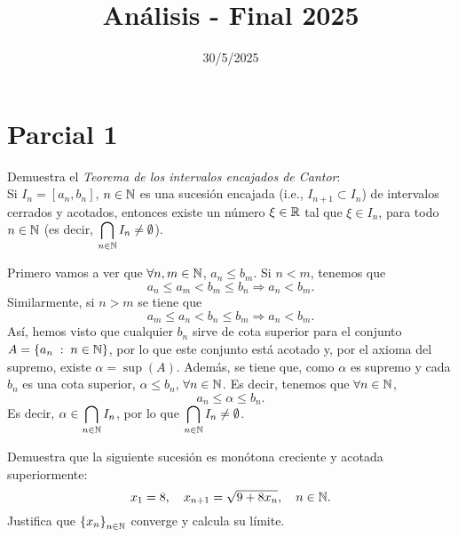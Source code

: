 \documentclass{article}
\begin{document}
\title{Análisis - Final 2025}
\date{30/5/2025}

\maketitle
\section{Parcial 1}
\begin{ej}
	Demuestra el \textit{Teorema de los intervalos encajados de Cantor}: \\
	Si $\displaystyle I_{n} = \left[a_{n}, b_{n}\right]  $, $\displaystyle n \in \mathbb{N} $ es una sucesión encajada (i.e., $\displaystyle I_{n+1} \subset I_{n} $) de intervalos cerrados y acotados, entonces existe un número $\displaystyle \xi \in \mathbb{R} $ tal que $\displaystyle \xi \in I_{n} $, para todo $\displaystyle n \in \mathbb{N} $ (es decir, $\displaystyle \bigcap_{n \in \mathbb{N}}I_{n} \neq \emptyset $).
\end{ej}
\begin{sol}
Primero vamos a ver que $\displaystyle \forall n,m \in \mathbb{N} $, $\displaystyle a_{n} \leq b_{m} $. Si $\displaystyle n < m $, tenemos que 
\[a_{n} \leq a_{m} < b_{m} \leq b_{n} \Rightarrow a_{n} < b_{m} .\]
Similarmente, si $\displaystyle n > m $ se tiene que 
\[a_{m} \leq a_{n} < b_{n} \leq b_{m} \Rightarrow a_{n} < b_{m} .\]
Así, hemos visto que cualquier $\displaystyle b_{n} $ sirve de cota superior para el conjunto $\displaystyle A = \left\{ a_{n} \; : \; n \in \mathbb{N}\right\}  $, por lo que este conjunto está acotado y, por el axioma del supremo, existe $\displaystyle \alpha = \sup\left(A\right) $. Además, se tiene que, como $\displaystyle \alpha  $ es supremo y cada $\displaystyle b_{n} $ es una cota superior, $\displaystyle \alpha \leq b_{n} $, $\displaystyle \forall n \in \mathbb{N} $. Es decir, tenemos que $\displaystyle \forall n \in \mathbb{N} $,
\[a_{n} \leq \alpha \leq b_{n} .\]
Es decir, $\displaystyle \alpha \in \bigcap_{n \in \mathbb{N}}I_{n} $, por lo que $\displaystyle \bigcap_{n \in \mathbb{N}}I_{n} \neq \emptyset $.
\end{sol}
\begin{ej}
Demuestra que la siguiente sucesión es monótona creciente y acotada superiormente:
\[x_{1} = 8, \quad x_{n+1} = \sqrt{9 +8x_{n}}, \quad n \in \mathbb{N} .\]
Justifica que $\displaystyle \left\{ x_{n}\right\} _{n\in\mathbb{N}} $ converge y calcula su límite.
\end{ej}
\end{document}

